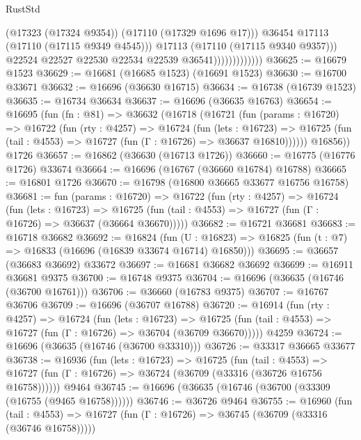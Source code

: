 \begin{lexlean}{RustStd}
\begin{coremodule}
                                    (@17323 (@17324 @9354))
                                    (@17110 (@17329 @1696 @17)))
                                  @36454
                                  @17113
                                  (@17110 (@17115 @9349 @4545)))
                                @17113
                                (@17110 (@17115 @9340 @9357)))
                              @22524
                              @22527
                              @22530
                              @22534
                              @22539
                              @36541)))))))))))))
@36625 := @16679 @1523
@36629 := @16681 (@16685 @1523) (@16691 @1523)
@36630 := @16700 @33671
@36632 := @16696 (@36630 @16715)
@36634 := @16738 (@16739 @1523)
@36635 := @16734 @36634
@36637 := @16696 (@36635 @16763)
@36654 := @16695
    (fun (fn : @81) =>
    @36632
      (@16718
        (@16721
          (fun (params : @16720) =>
          @16722
            (fun (rty : @4257) =>
            @16724
              (fun (lets : @16723) =>
              @16725 (fun (tail : @4553) => @16727 (fun (Γ : @16726) => @36637 @16810))))))
        @16856))
    @1726
@36657 := @16862 (@36630 (@16713 @1726))
@36660 := @16775 (@16776 @1726) @33674
@36664 := @16696 (@16767 (@36660 @16784) @16788)
@36665 := @16801 @1726
@36670 := @16798 (@16800 @36665 @33677 @16756 @16758)
@36681 := fun (params : @16720) =>
  @16722
    (fun (rty : @4257) =>
    @16724
      (fun (lets : @16723) =>
      @16725 (fun (tail : @4553) => @16727 (fun (Γ : @16726) => @36637 (@36664 @36670)))))
@36682 := @16721 @36681
@36683 := @16718 @36682
@36692 := @16824
    (fun (U : @16823) => @16825 (fun (t : @7) => @16833 (@16696 (@16839 @33674 @16714) @16850)))
@36695 := @36657 (@36683 @36692) @33672
@36697 := @16681 @36682 @36692
@36699 := @16911 @36681 @9375
@36700 := @16748 @9375
@36704 := @16696 (@36635 (@16746 (@36700 @16761)))
@36706 := @36660 (@16783 @9375)
@36707 := @16767 @36706
@36709 := @16696 (@36707 @16788)
@36720 := @16914
    (fun (rty : @4257) =>
    @16724
      (fun (lets : @16723) =>
      @16725 (fun (tail : @4553) => @16727 (fun (Γ : @16726) => @36704 (@36709 @36670)))))
    @4259
@36724 := @16696 (@36635 (@16746 (@36700 @33310)))
@36726 := @33317 @36665 @33677
@36738 := @16936
    (fun (lets : @16723) =>
    @16725
      (fun (tail : @4553) =>
      @16727 (fun (Γ : @16726) => @36724 (@36709 (@33316 (@36726 @16756 @16758))))))
    @9464
@36745 := @16696 (@36635 (@16746 (@36700 (@33309 (@16755 (@9465 @16758))))))
@36746 := @36726 @9464
@36755 := @16960
    (fun (tail : @4553) => @16727 (fun (Γ : @16726) => @36745 (@36709 (@33316 (@36746 @16758)))))

\end{coremodule}
\end{lexlean}
